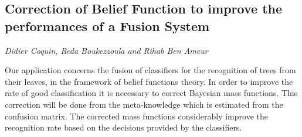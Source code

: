 \documentclass[../booklet.tex]{subfiles}
\begin{document}
\subsection[Correction of Belief Function to improve the performances of a Fusion System. {\it Didier Coquin, Reda Boukezzoula and Rihab Ben Ameur}]{Correction of Belief Function to improve the performances of a Fusion System}
  

\begin{center}
  {\it Didier Coquin, Reda Boukezzoula and Rihab Ben Ameur}
\end{center}



Our application concerns the fusion of classifiers for the recognition of trees from their leaves, in the framework of belief functions theory. In order to improve the rate of good classification it is necessary to correct Bayesian mass functions. This correction will be done from the meta-knowledge which is estimated from the confusion matrix. The corrected mass functions considerably improve the recognition rate based on the decisions provided by the classifiers.
\end{document}
